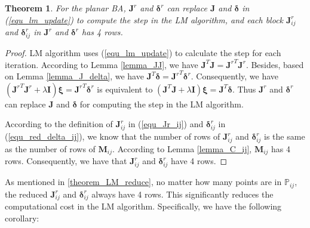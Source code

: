 \documentclass{vgtc}                          %
\newtheorem{theorem}{Theorem}
\begin{document}
\begin{theorem} \label{theorem_LM_reduce}
	For the planar BA, $\mathbf{J}^{r}$ and $\bm{\delta}^{r}$ can replace $\mathbf{J}$ and $\bm{\delta}$ in   (\ref{equ_lm_update}) to compute the step in the LM algorithm, and  each block $\mathbf{J}^{r}_{ij}$ and $\bm{\delta}^{r}_{ij}$ in $\mathbf{J}^{r}$ and $\bm{\delta}^{r}$ has 4 rows.
\end{theorem}
\begin{proof}
	LM algorithm uses (\ref{equ_lm_update}) to calculate the step for each iteration. According to Lemma \autoref{lemma_JJ}, we have $\mathbf{J}^{T}\mathbf{J} = {\mathbf{J}^{r}}^{T}\mathbf{J}^{r}$. Besides, based on  Lemma \ref{lemma_J_delta}, we have $\mathbf{J}^{T}\bm{\delta} = {\mathbf{J}^r}^{T}\bm{\delta}^{r} $. Consequently, we have  $\left( {\mathbf{J}^r}^{T} \mathbf{J}^r+\lambda\mathbf{I}\right) \bm{\xi} =  {\mathbf{J}^{r}}^{T} \bm{\delta}^{r} $  is equivalent to  $\left( \mathbf{J}^{T} \mathbf{J}+\lambda\mathbf{I}\right) \bm{\xi} =  \mathbf{J}^{T} \bm{\delta}$. Thus $\mathbf{J}^{r}$ and $\bm{\delta}^{r}$ can replace $\mathbf{J}$ and $\bm{\delta}$ for computing the step in the LM algorithm.
	
	According to the definition of  $\mathbf{J}^{r}_{ij}$ in (\ref{equ_Jr_ij}) and $\bm{\delta}^{r}_{ij}$ in (\ref{equ_red_delta_ij}), we know that the number of rows of  $\mathbf{J}^{r}_{ij}$ and  $\bm{\delta}^{r}_{ij}$ is the same as the number of rows of $\mathbf{M}_{ij}$. According to Lemma \autoref{lemma_C_ij},  $\mathbf{M}_{ij}$ has 4 rows. Consequently, we have that  $\mathbf{J}^{r}_{ij}$ and $\bm{\delta}^{r}_{ij}$ have 4 rows. %
\end{proof}

As mentioned in  \autoref{theorem_LM_reduce}, no matter how many points are  in $\mathbb{P}_{ij}$, the reduced  $\mathbf{J}^{r}_{ij}$ and $\bm{\delta}_{ij}^{r}$ always have 4 rows. This significantly reduces the computational cost in the LM algorithm. Specifically, we have the following corollary:
\end{document}
